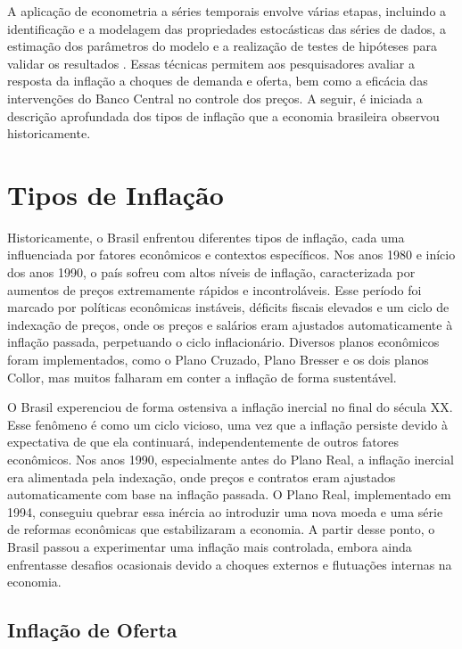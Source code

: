 \documentclass[12pt,oneside,a4paper,chapter=TITLE,english,brazil,sumario=abnt-6027-2012]{abntex2}
\begin{document}
A aplicação de econometria a séries temporais envolve várias etapas, incluindo a identificação e a modelagem das propriedades estocásticas das séries de dados, a estimação dos parâmetros do modelo e a realização de testes de hipóteses para validar os resultados \cite{stock_2020_introduction}. Essas técnicas permitem aos pesquisadores avaliar a resposta da inflação a choques de demanda e oferta, bem como a eficácia das intervenções do Banco Central no controle dos preços. A seguir, é iniciada a descrição aprofundada dos tipos de inflação que a economia brasileira observou historicamente.

\chapter{Tipos de Inflação}

Historicamente, o Brasil enfrentou diferentes tipos de inflação, cada uma influenciada por fatores econômicos e contextos específicos. Nos anos 1980 e início dos anos 1990, o país sofreu com altos níveis de inflação, caracterizada por aumentos de preços extremamente rápidos e incontroláveis. Esse período foi marcado por políticas econômicas instáveis, déficits fiscais elevados e um ciclo de indexação de preços, onde os preços e salários eram ajustados automaticamente à inflação passada, perpetuando o ciclo inflacionário. Diversos planos econômicos foram implementados, como o Plano Cruzado, Plano Bresser e os dois planos Collor, mas muitos falharam em conter a inflação de forma sustentável.

O Brasil experenciou de forma ostensiva a inflação inercial no final do sécula XX. Esse fenômeno é como um ciclo vicioso, uma vez que a inflação persiste devido à expectativa de que ela continuará, independentemente de outros fatores econômicos. Nos anos 1990, especialmente antes do Plano Real, a inflação inercial era alimentada pela indexação, onde preços e contratos eram ajustados automaticamente com base na inflação passada. O Plano Real, implementado em 1994, conseguiu quebrar essa inércia ao introduzir uma nova moeda e uma série de reformas econômicas que estabilizaram a economia. A partir desse ponto, o Brasil passou a experimentar uma inflação mais controlada, embora ainda enfrentasse desafios ocasionais devido a choques externos e flutuações internas na economia.

\section{Inflação de Oferta}
\end{document}
